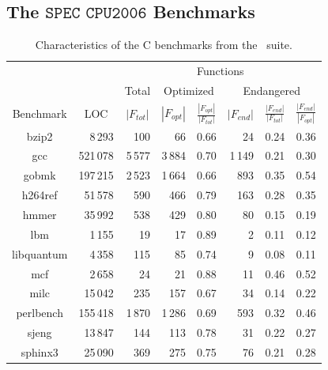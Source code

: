 \subsection{The \texorpdfstring{$\texttt{SPEC CPU2006}$}{SPEC CPU2006} Benchmarks}

\begin{table}[!t]
\begin{center}
\begin{small}
\begin{tabular}{ |c|r|r|r|r|r|r|r| }
\cline{3-8}
\multicolumn{2}{l|}{} & \multicolumn{6}{c|}{Functions} \\
\cline{3-8}
\multicolumn{2}{l|}{} & \multicolumn{1}{c|}{Total} & \multicolumn{2}{c|}{Optimized} & \multicolumn{3}{c|}{Endangered} \\
\hline
Benchmark & \multicolumn{1}{c|}{LOC} & \multicolumn{1}{c|}{$|F_{tot}|$} & \multicolumn{1}{c|}{$|F_{opt}|$}  & \multicolumn{1}{c|}{\tiny$\frac{|F_{opt}|}{|F_{tot}|}$} & \multicolumn{1}{c|}{$|F_{end}|$} & \multicolumn{1}{c|}{\tiny$\frac{|F_{end}|}{|F_{tot}|}$} & \multicolumn{1}{c|}{\tiny$\frac{|F_{end}|}{|F_{opt}|}$} \\ 
\hline
\hline
bzip2 & 8\,293 & 100 & 66 & 0.66 & 24 & 0.24 & 0.36 \\ 
\hline
gcc & 521\,078 & 5\,577 & 3\,884 & 0.70 & 1\,149 & 0.21 & 0.30 \\
\hline
gobmk & 197\,215 & 2\,523 & 1\,664 & 0.66 & 893 & 0.35 & 0.54 \\ 
\hline
h264ref & 51\,578 & 590 & 466 & 0.79 & 163 & 0.28 & 0.35 \\ 
\hline
hmmer & 35\,992 & 538 & 429 & 0.80 & 80 & 0.15 & 0.19 \\ 
\hline
lbm & 1\,155 & 19 & 17 & 0.89 & 2 & 0.11 & 0.12 \\ 
\hline
libquantum & 4\,358 & 115 & 85 & 0.74 & 9 & 0.08 & 0.11\\ 
\hline
mcf & 2\,658 & 24 & 21 & 0.88 & 11 & 0.46 & 0.52 \\ 
\hline
milc & 15\,042 & 235 & 157 & 0.67 & 34 & 0.14 & 0.22\\ 
\hline
perlbench & 155\,418 & 1\,870 & 1\,286 & 0.69 & 593 & 0.32 & 0.46 \\ 
\hline
sjeng & 13\,847 & 144 & 113 & 0.78 & 31 & 0.22 & 0.27 \\ 
\hline
sphinx3 & 25\,090 & 369 & 275 & 0.75 & 76 & 0.21 & 0.28 \\ 
\hline
\end{tabular} 
\end{small}
\end{center}
\caption{\label{tab:CS-debug-benchmarks} Characteristics of the C benchmarks from the \speccpu\ suite.} 
\end{table}

